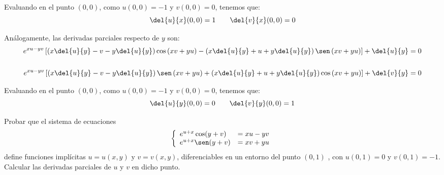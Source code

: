 \begin{ejercicio}
    Evaluando en el punto $(0,0)$, como $u(0,0)=-1$ y $v(0,0)=0$, tenemos que:
    \begin{equation*}
        \del{u}{x}(0,0) = 1 \qquad \del{v}{x}(0,0) = 0
    \end{equation*}


    Análogamente, las derivadas parciales respecto de $y$ son:
    \begin{align*}
        e^{xu-yv} \left[\left(x\del{u}{y} -v - y\del{u}{y}\right)\cos \left(xv+yu\right) - \left(x\del{u}{y} +u+ y\del{u}{y}\right)\sen \left(xv+yu\right)\right] + \del{u}{y} &= 0 \\ \\
        e^{xu-yv} \left[\left(x\del{u}{y} -v - y\del{u}{y}\right)\sen \left(xv+yu\right) + \left(x\del{u}{y} +u+ y\del{u}{y}\right)\cos \left(xv+yu\right)\right] + \del{v}{y} &= 0
    \end{align*}

    Evaluando en el punto $(0,0)$, como $u(0,0)=-1$ y $v(0,0)=0$, tenemos que:
    \begin{equation*}
        \del{u}{y}(0,0) = 0 \qquad \del{v}{y}(0,0) = 1
    \end{equation*}
            
\end{ejercicio}




\begin{ejercicio}
    Probar que el sistema de ecuaciones
    \begin{equation*}
        \left\{
            \begin{array}{ll}
                e^{u+x} \cos(y+v) &=xu-yv \\
                e^{u+x} \sen(y+v) &= xv+yu
            \end{array}
        \right.
    \end{equation*}
    define funciones implícitas $u = u(x, y)$ y $v = v(x, y)$, diferenciables en un entorno
    del punto $(0,1)$ , con $u(0,1)=0$ y $v(0,1) = -1$. Calcular las derivadas parciales
    de $u$ y $v$ en dicho punto.
\end{ejercicio}